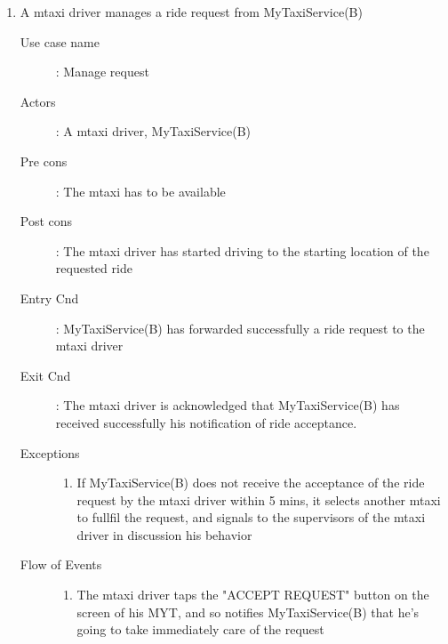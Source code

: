 \documentclass[11pt]{article} %
\begin{document}
\begin{enumerate}
	
	        \item A mtaxi driver manages a ride request from MyTaxiService(B)
		\begin{description}
		        \item [Use case name]: Manage request
		        \item [Actors]: A mtaxi driver, MyTaxiService(B)
		        \item [Pre cons]: The mtaxi has to be available
		        \item [Post cons]: The mtaxi driver has started driving to the starting location of the requested ride
		        \item [Entry Cnd]: MyTaxiService(B) has forwarded successfully a ride request to the mtaxi driver
		        \item [Exit Cnd]: The mtaxi driver is acknowledged that MyTaxiService(B) has received successfully his notification
		        of ride acceptance.
		        \item [Exceptions]\hfill
			\begin{enumerate}
			          \item If MyTaxiService(B) does not receive the acceptance of the ride request by the mtaxi driver
			          within 5 mins, it selects another mtaxi to fullfil the request, and signals to the supervisors
			          of the mtaxi driver in discussion his behavior
			\end{enumerate}
		        \item [Flow of Events]\hfill
			\begin{enumerate}
			          \item The mtaxi driver taps the "ACCEPT REQUEST" button on the screen of his MYT, and so notifies MyTaxiService(B)
			          that he's going to take immediately care of the request
			\end{enumerate}
		\end{description}
	

\end{enumerate}
\end{document}
